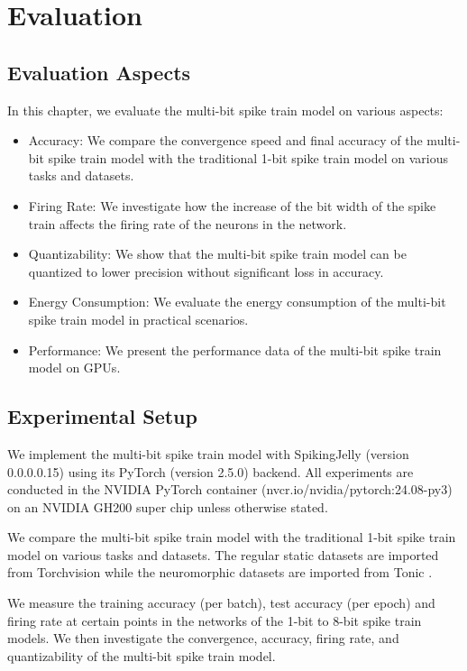 \chapter{Evaluation}
\label{chap:evaluation}

\section{Evaluation Aspects}
\label{sec:evaluation-aspects}
    In this chapter, we evaluate the multi-bit spike train model on various aspects: 
    \begin{itemize}
        \item Accuracy: We compare the convergence speed and final accuracy of the multi-bit spike train model with the traditional 1-bit spike train model on various tasks and datasets.
        \item Firing Rate: We investigate how the increase of the bit width of the spike train affects the firing rate of the neurons in the network.
        \item Quantizability: We show that the multi-bit spike train model can be quantized to lower precision without significant loss in accuracy.
        \item Energy Consumption: We evaluate the energy consumption of the multi-bit spike train model in practical scenarios.
        \item Performance: We present the performance data of the multi-bit spike train model on GPUs. 
    \end{itemize}

\section{Experimental Setup}
\label{sec:experimental-setup}
    We implement the multi-bit spike train model with SpikingJelly \cite{doi:10.1126/sciadv.adi1480} (version 0.0.0.0.15) using its PyTorch \cite{NEURIPS2019_9015} (version 2.5.0) backend. All experiments are conducted in the NVIDIA PyTorch container (nvcr.io/nvidia/pytorch:24.08-py3) on an NVIDIA GH200 super chip unless otherwise stated. 

    We compare the multi-bit spike train model with the traditional 1-bit spike train model on various tasks and datasets. The regular static datasets are imported from Torchvision \cite{10.1145/1873951.1874254} while the neuromorphic datasets are imported from Tonic \cite{lenz_2021_5079802}. 

    We measure the training accuracy (per batch), test accuracy (per epoch) and firing rate at certain points in the networks of the 1-bit to 8-bit spike train models. We then investigate the convergence, accuracy, firing rate, and quantizability of the multi-bit spike train model. 


